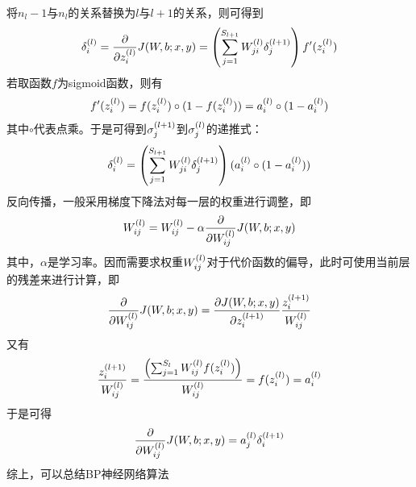 将$n_l-1$与$n_l$的关系替换为$l$与$l+1$的关系，则可得到
\begin{eqnarray}
\samplet{\delta}{l}{i}=\frac{\partial}{\partial \samplet{z}{l}{i}}J(W,b;x,y)=
\left(
	\begin{aligned}
		\sum_{j=1}^{S_{l+1}}\samplet{W}{l}{ji}\samplet{\delta}{l+1}{j}
	\end{aligned}
\right)
f'(\samplet{z}{l}{i})
\end{eqnarray}
若取函数$f$为sigmoid函数，则有
\begin{eqnarray}
f'(\samplet{z}{l}{i})=f(\samplet{z}{l}{i})\circ(1-f(\samplet{z}{l}{i}))=\samplet{a}{l}{i}\circ(1-\samplet{a}{l}{i})
\end{eqnarray}
其中$\circ$代表点乘。于是可得到$\samplet{\sigma}{l+1}{j}$到$\samplet{\sigma}{l}{j}$的递推式：
\begin{eqnarray}
\samplet{\delta}{l}{i}=
\left(
	\begin{aligned}
		\sum_{j=1}^{S_{l+1}}\samplet{W}{l}{ji}\samplet{\delta}{l+1}{j}
	\end{aligned}
\right)
(\samplet{a}{l}{i}\circ(1-\samplet{a}{l}{i}))
\end{eqnarray}
反向传播，一般采用梯度下降法对每一层的权重进行调整，即
\begin{eqnarray}
\samplet{W}{l}{ij}=\samplet{W}{l}{ij}-\alpha\frac{\partial}{\partial \samplet{W}{l}{ij}}J(W,b;x,y)
\end{eqnarray}
其中，$\alpha$是学习率。因而需要求权重$\samplet{W}{l}{ij}$对于代价函数的偏导，此时可使用当前层的残差来进行计算，即
\begin{eqnarray}
\frac{\partial}{\partial \samplet{W}{l}{ij}}J(W,b;x,y)=\frac{\partial J(W,b;x,y)}{\partial \samplet{z}{l+1}{i}}\frac{\samplet{z}{l+1}{i}}{\samplet{W}{l}{ij}}
\end{eqnarray}
又有
\begin{eqnarray}
\frac{\samplet{z}{l+1}{i}}{\samplet{W}{l}{ij}}=\frac{\left( \sum_{j=1}^{S_l}\samplet{W}{l}{ij}f(\samplet{z}{l}{i}) \right)}{\samplet{W}{l}{ij}}=f(\samplet{z}{l}{i})=\samplet{a}{l}{i}
\end{eqnarray}
于是可得
\begin{eqnarray}
\frac{\partial}{\partial \samplet{W}{l}{ij}}J(W,b;x,y)=\samplet{a}{l}{j}\samplet{\delta}{l+1}{i}
\end{eqnarray}
综上，可以总结BP神经网络算法
